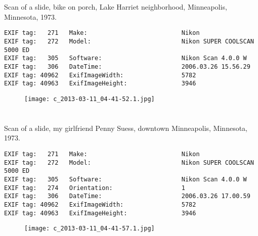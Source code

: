 \section{\protect{}}
\noindent Scan of a slide, bike on porch, Lake Harriet neighborhood, Minneapolis, Minnesota, 1973.
\noindent
\begin{lstlisting}
EXIF tag:   271   Make:                          Nikon
EXIF tag:   272   Model:                         Nikon SUPER COOLSCAN 5000 ED
EXIF tag:   305   Software:                      Nikon Scan 4.0.0 W
EXIF tag:   306   DateTime:                      2006.03.26 15.56.29
EXIF tag: 40962   ExifImageWidth:                5782
EXIF tag: 40963   ExifImageHeight:               3946

\end{lstlisting}
\clearpage
\begin{figure}
\raggedleft
\texttt{[image: c\_2013-03-11\_04-41-52.1.jpg]}
\end{figure}


\clearpage
\section{\protect{}}
\noindent Scan of a slide, my girlfriend Penny Suess, downtown Minneapolis, Minnesota, 1973.
\noindent
\begin{lstlisting}
EXIF tag:   271   Make:                          Nikon
EXIF tag:   272   Model:                         Nikon SUPER COOLSCAN 5000 ED
EXIF tag:   305   Software:                      Nikon Scan 4.0.0 W
EXIF tag:   274   Orientation:                   1
EXIF tag:   306   DateTime:                      2006.03.26 17.00.59
EXIF tag: 40962   ExifImageWidth:                5782
EXIF tag: 40963   ExifImageHeight:               3946

\end{lstlisting}
\clearpage
\begin{figure}
\raggedleft
\texttt{[image: c\_2013-03-11\_04-41-57.1.jpg]}
\end{figure}


\clearpage
